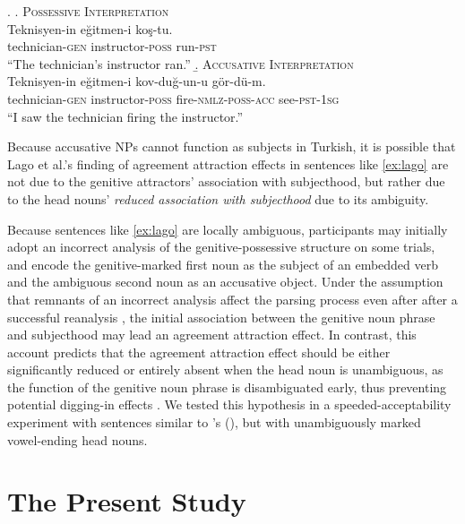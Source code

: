 \documentclass[]{interact}\usepackage[]{graphicx}\usepackage[]{color}
\theoremstyle{plain}%
\theoremstyle{definition}
\theoremstyle{remark}
\newcommand{\rev}[1]{{\color{red}#1}}
\begin{document}
\ex.
\label{ex:ambiguous}
  \a. \textsc{Possessive Interpretation} \label{ex:ambiguous_possessive} \\
  \gll Teknisyen-in e\u{g}itmen-i ko\c{s}-tu.\\
       technician-\textsc{gen} instructor-\textsc{poss} run-\textsc{pst}\\
  \glt ``The technician's instructor ran.''
  \b. \textsc{Accusative Interpretation} \label{ex:ambiguous_accusative}\\
  \gll Teknisyen-in e\u{g}itmen-i kov-du\u{g}-un-u g\"{o}r-d\"{u}-m.\\
  technician-\textsc{gen} instructor-\textsc{poss} fire-\textsc{nmlz}-\textsc{poss}-\textsc{acc} see-\textsc{pst}-\textsc{1sg}\\
  \glt ``I saw the technician firing the \rev{instructor}.''

Because accusative NPs cannot function as subjects in Turkish, it is possible that Lago et al.'s finding of agreement attraction effects in sentences like \ref{ex:lago} are not due to the genitive attractors' association with subjecthood, but rather due to the head nouns' \textit{reduced association with subjecthood} due to its ambiguity.

Because sentences like \ref{ex:lago} are locally ambiguous, participants may initially adopt an incorrect analysis of the genitive-possessive structure on some trials, and encode the genitive-marked first noun as the subject of an embedded verb and the ambiguous second noun as an accusative object. 
Under the assumption that remnants of an incorrect analysis affect the parsing process even after after a successful reanalysis \citep{Staub:2007}, the initial association between the genitive noun phrase and subjecthood may lead an agreement attraction effect. 
In contrast, this account predicts that the agreement attraction effect should be either significantly reduced or entirely absent when the head noun is unambiguous, as the function of the genitive noun phrase is disambiguated early, thus preventing potential digging-in effects \citep{Tabor:2004}. We tested this hypothesis in a speeded-acceptability experiment with sentences similar to \citeauthor{LagoEtAl:2019}'s (\citeyear{LagoEtAl:2019}), but with unambiguously marked vowel-ending head nouns. 

\section{The Present Study}
\end{document}
